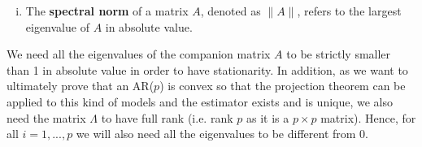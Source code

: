 \documentclass{article}
\begin{document}
\begin{enumerate}[(i)]
\item The \textbf{spectral norm} of a matrix $A$, denoted as $\lVert A \rVert$, refers to the largest eigenvalue of $A$ in absolute value.
\end{enumerate}

We need all the eigenvalues of the companion matrix $A$ to be strictly smaller than 1 in absolute value in order to have stationarity. In addition, as we want to ultimately prove that an AR($p$) is convex so that the projection theorem can be applied to this kind of models and the estimator exists and is unique, we also need the matrix $\Lambda$ to have full rank (i.e. rank $p$ as it is a $p \times p$ matrix). Hence, for all $i = 1, ..., p$ we will also need all the eigenvalues to be different from 0. \newline
\end{document}
